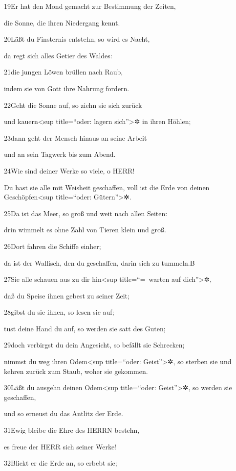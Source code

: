 19Er hat den Mond gemacht zur Bestimmung der Zeiten,

die Sonne, die ihren Niedergang kennt.

20Läßt du Finsternis entstehn, so wird es Nacht,

da regt sich alles Getier des Waldes:

21die jungen Löwen brüllen nach Raub,

indem sie von Gott ihre Nahrung fordern.

22Geht die Sonne auf, so ziehn sie sich zurück

und kauern\textless sup title=``oder: lagern sich''\textgreater✲ in
ihren Höhlen;

23dann geht der Mensch hinaus an seine Arbeit

und an sein Tagwerk bis zum Abend.

24Wie sind deiner Werke so viele, o HERR!

Du hast sie alle mit Weisheit geschaffen, voll ist die Erde von deinen
Geschöpfen\textless sup title=``oder: Gütern''\textgreater✲.

25Da ist das Meer, so groß und weit nach allen Seiten:

drin wimmelt es ohne Zahl von Tieren klein und groß.

26Dort fahren die Schiffe einher;

da ist der Walfisch, den du geschaffen, darin sich zu tummeln.{B}

27Sie alle schauen aus zu dir hin\textless sup title=``=~warten auf
dich''\textgreater✲,

daß du Speise ihnen gebest zu seiner Zeit;

28gibst du sie ihnen, so lesen sie auf;

tust deine Hand du auf, so werden sie satt des Guten;

29doch verbirgst du dein Angesicht, so befällt sie Schrecken;

nimmst du weg ihren Odem\textless sup title=``oder:
Geist''\textgreater✲, so sterben sie und kehren zurück zum Staub, woher
sie gekommen.

30Läßt du ausgehn deinen Odem\textless sup title=``oder:
Geist''\textgreater✲, so werden sie geschaffen,

und so erneust du das Antlitz der Erde.

31Ewig bleibe die Ehre des HERRN bestehn,

es freue der HERR sich seiner Werke!

32Blickt er die Erde an, so erbebt sie;

